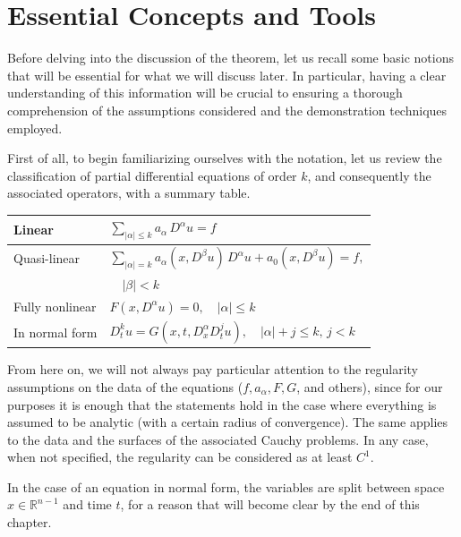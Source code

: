 \chapter{Essential Concepts and Tools} \label{tools}
Before delving into the discussion of the theorem, let us recall some basic notions that will be essential for what we will discuss later. 
In particular, having a clear understanding of this information will be crucial to ensuring a thorough comprehension of the assumptions considered and the demonstration techniques employed.

First of all, to begin familiarizing ourselves with the notation, let us review the classification of partial differential equations of order $k$, and consequently the associated operators, with a summary table.
\vspace{5mm}
\begin{center}
\renewcommand{\arraystretch}{2}
\begin{tabular}{l l} 
\hline \hline
 Linear & $\sum_{|\alpha |\leq k} a_\alpha \, D^\alpha u = f$ \\ 
 \hline
 \vspace{-2mm}
 Quasi-linear & $\sum_{|\alpha |= k} a_\alpha (x,D^\beta u) \, D^\alpha u +  a_0(x,D^\beta u)= f,$\\ 
 & $\quad |\beta |<k $ \\
 \hline
 Fully nonlinear & $F(x,D^\alpha u)=0, \quad |\alpha | \leq k$ \\ 
 \hline
 In normal form & $D_{t}^k u = G(x,t, D^\alpha_x D^j_t u), \quad |\alpha |+j \leq k, \, j < k$ \\ 
 \hline \hline
\end{tabular}
\end{center}
\vspace{5mm}
\begin{remark}
From here on, we will not always pay particular attention to the regularity assumptions on the data of the equations ($f,a_\alpha,F,G$, and others), since for our purposes it is enough that the statements hold in the case where everything is assumed to be analytic (with a certain radius of convergence). The same applies to the data and the surfaces of the associated Cauchy problems. In any case, when not specified, the regularity can be considered as at least $C^1$.
\end{remark}
\begin{remark}
In the case of an equation in normal form, the variables are split between space $x\in \mathbb{R}^{n-1}$ and time $t$, for a reason that will become clear by the end of this chapter.
\end{remark}
